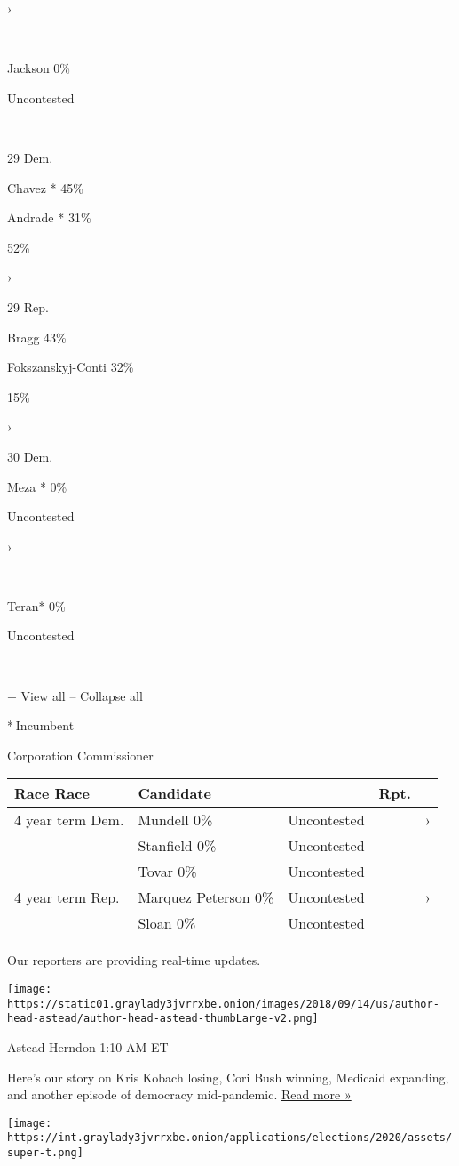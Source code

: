 ›

~

Jackson 0\%

Uncontested

~

29 Dem.

 Chavez * 45\%

 Andrade * 31\%

52\%

›

29 Rep.

 Bragg 43\%

 Fokszanskyj-Conti 32\%

15\%

›

30 Dem.

 Meza * 0\%

Uncontested

›

~

Teran* 0\%

Uncontested

~

+ View all -- Collapse all

* Incumbent~

Corporation Commissioner

\begin{longtable}[]{@{}lllll@{}}
\toprule
Race Race & Candidate & & Rpt. &\tabularnewline
\midrule
\endhead
4 year term Dem. & Mundell 0\% & Uncontested & & ›\tabularnewline
& Stanfield 0\% & Uncontested & &\tabularnewline
& Tovar 0\% & Uncontested & &\tabularnewline
4 year term Rep. & Marquez Peterson 0\% & Uncontested & &
›\tabularnewline
& Sloan 0\% & Uncontested & &\tabularnewline
\bottomrule
\end{longtable}

Our reporters are providing real-time updates.

\texttt{[image: https://static01.graylady3jvrrxbe.onion/images/2018/09/14/us/author-head-astead/author-head-astead-thumbLarge-v2.png]}

Astead Herndon 1:10 AM ET

Here's our story on Kris Kobach losing, Cori Bush winning, Medicaid
expanding, and another episode of democracy mid-pandemic.
\href{https://www.nytimes3xbfgragh.onion/2020/08/04/us/politics/kobach-tlaib.html?action=click\&module=ELEX_results\&pgtype=Interactive\&region=ReporterUpdates}{Read
more »}

\texttt{[image: https://int.graylady3jvrrxbe.onion/applications/elections/2020/assets/super-t.png]}

